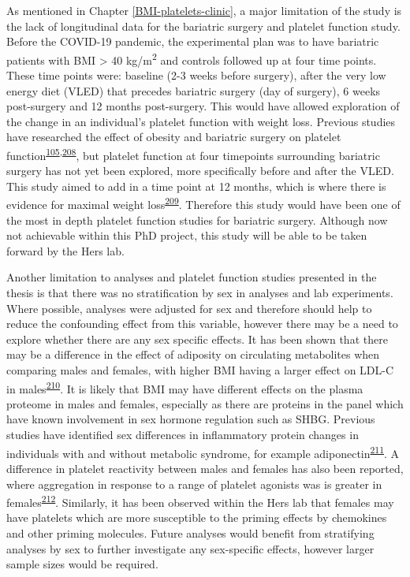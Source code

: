 \documentclass[11pt,twoside]{bristolthesis}
\begin{document}
As mentioned in Chapter \ref{BMI-platelets-clinic}, a major limitation of the study is the lack of longitudinal data for the bariatric surgery and platelet function study. Before the COVID-19 pandemic, the experimental plan was to have bariatric patients with BMI \textgreater{} 40 kg/m\textsuperscript{2} and controls followed up at four time points. These time points were: baseline (2-3 weeks before surgery), after the very low energy diet (VLED) that precedes bariatric surgery (day of surgery), 6 weeks post-surgery and 12 months post-surgery. This would have allowed exploration of the change in an individual's platelet function with weight loss. Previous studies have researched the effect of obesity and bariatric surgery on platelet function\textsuperscript{\protect\hyperlink{ref-Barrachina2019}{105},\protect\hyperlink{ref-Dobrydneva2012}{208}}, but platelet function at four timepoints surrounding bariatric surgery has not yet been explored, more specifically before and after the VLED. This study aimed to add in a time point at 12 months, which is where there is evidence for maximal weight loss\textsuperscript{\protect\hyperlink{ref-Maciejewski2016}{209}}. Therefore this study would have been one of the most in depth platelet function studies for bariatric surgery. Although now not achievable within this PhD project, this study will be able to be taken forward by the Hers lab.

Another limitation to analyses and platelet function studies presented in the thesis is that there was no stratification by sex in analyses and lab experiments. Where possible, analyses were adjusted for sex and therefore should help to reduce the confounding effect from this variable, however there may be a need to explore whether there are any sex specific effects. It has been shown that there may be a difference in the effect of adiposity on circulating metabolites when comparing males and females, with higher BMI having a larger effect on LDL-C in males\textsuperscript{\protect\hyperlink{ref-OKeeffe2022}{210}}. It is likely that BMI may have different effects on the plasma proteome in males and females, especially as there are proteins in the panel which have known involvement in sex hormone regulation such as SHBG. Previous studies have identified sex differences in inflammatory protein changes in individuals with and without metabolic syndrome, for example adiponectin\textsuperscript{\protect\hyperlink{ref-TerHorst2020}{211}}. A difference in platelet reactivity between males and females has also been reported, where aggregation in response to a range of platelet agonists was is greater in females\textsuperscript{\protect\hyperlink{ref-Becker2006}{212}}. Similarly, it has been observed within the Hers lab that females may have platelets which are more susceptible to the priming effects by chemokines and other priming molecules. Future analyses would benefit from stratifying analyses by sex to further investigate any sex-specific effects, however larger sample sizes would be required.
\end{document}
